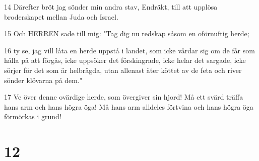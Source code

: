 \par 14 Därefter bröt jag sönder min andra stav, Endräkt, till att upplösa broderskapet mellan Juda och Israel.
\par 15 Och HERREN sade till mig: "Tag dig nu redskap såsom en oförnuftig herde;
\par 16 ty se, jag vill låta en herde uppstå i landet, som icke vårdar sig om de får som hålla på att förgås, icke uppsöker det förskingrade, icke helar det sargade, icke sörjer för det som är helbrägda, utan allenast äter köttet av de feta och river sönder klövarna på dem."
\par 17 Ve över denne ovärdige herde, som övergiver sin hjord! Må ett svärd träffa hans arm och hans högra öga! Må hans arm alldeles förtvina och hans högra öga förmörkas i grund!

\chapter{12}

